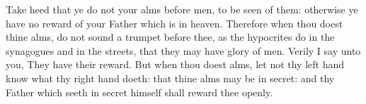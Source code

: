 \documentclass{grattanAlpha}
\begin{document}
Take heed that ye do not your alms before men, to be seen of them: otherwise ye have no reward of your Father which is in heaven. Therefore when thou doest thine alms, do not sound a trumpet before thee, as the hypocrites do in the synagogues and in the streets, that they may have glory of men. Verily I say unto you, They have their reward.  But when thou doest alms, let not thy left hand know what thy right hand doeth:  that thine alms may be in secret: and thy Father which seeth in secret himself shall reward thee openly.
\end{document}

